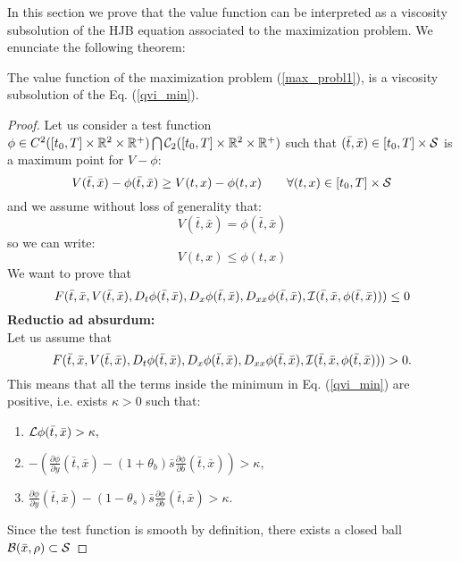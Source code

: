 In this section we prove that the value function can be interpreted as a viscosity subsolution of the HJB equation associated to the maximization problem. 
We enunciate the following theorem:
\begin{Theorem}\label{subsolution_th}
 The value function of the maximization problem (\ref{max_probl1}), is a viscosity subsolution of the Eq. (\ref{qvi_min}).
\end{Theorem}
\begin{proof}
Let us consider a test function $ \phi \in C^2([t_0,T] \times \mathbb{R}^2\times \mathbb{R}^+) \bigcap \mathcal{C}_2([t_0,T] \times \mathbb{R}^2\times \mathbb{R}^+)$ such that 
$(\bar t,\bar x) \in [t_0,T] \times \mathcal{S}$ is a maximum point for $V-\phi$:
\begin{equation}
 V(\bar t,\bar x) - \phi(\bar t,\bar x) \geq V(t,x) - \phi(t, x) \hspace{2em} \forall (t,x) \in [t_0,T] \times \mathcal{S}
\end{equation}
and we assume without loss of generality that:
\begin{equation}\label{max_point}
V(\bar t,\bar x) = \phi(\bar t,\bar x)  
\end{equation}
so we can write:
\begin{equation}\label{max_point2}
V(t,x) \leq \phi(t, x) 
\end{equation}
We want to prove that
$$ F(\bar t,\bar x,V(\bar t, \bar x),D_t \phi(\bar t, \bar x),D_x \phi(\bar t, \bar x),D_{xx}\phi(\bar t, \bar x),
\mathcal{I}(\bar t, \bar x,\phi(\bar t, \bar x))) \leq 0  $$
\textbf{Reductio ad absurdum:}\\
Let us assume that 
$$F(\bar t,\bar x,V(\bar t, \bar x),D_t \phi(\bar t, \bar x),D_x \phi(\bar t, \bar x),D_{xx}\phi(\bar t, \bar x),
\mathcal{I}(\bar t,\bar x,\phi(\bar t, \bar x))) >0.$$ 
This means that all the terms inside the minimum in Eq. (\ref{qvi_min}) are positive, i.e. exists $\kappa >0$ such that:
\begin{enumerate}
 \item $ \mathcal{L} \phi(\bar t, \bar x) > \kappa ,$
 \item $-\left(\frac{\partial \phi}{\partial y}(\bar t, \bar x)
 -(1+\theta_b) \bar s \frac{\partial \phi}{\partial b}(\bar t, \bar x)\right) > \kappa,$
 \item $\frac{\partial \phi}{\partial y}(\bar t, \bar x)-(1-\theta_s) \bar s \frac{\partial \phi}{\partial b}(\bar t, \bar x) > \kappa.$
\end{enumerate}
Since the test function is smooth by definition, there exists a closed ball $\mathcal{B}(\bar x, \rho) \subset \mathcal{S}$

\end{proof}
